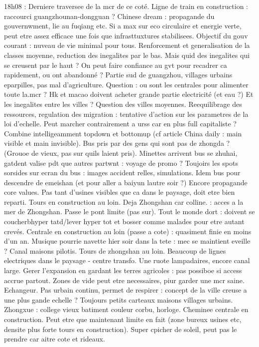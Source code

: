 18h08 :
Derniere traversee de la mcr de ce coté. Ligne de train en construction : raccourci guangzhounan-dongguan ?
Chinese dream : propagande du gouvernwment, lie au fuqiang etc. 
Si a max sur eco circulaire et energie verte, peut etre assez efficace une fois que infrasttuxtures stabilisees. Objectif du gouv courant : nuveau de vie minimal pour tous. Renforcement et generalisation de la classes moyenne, reduction des inegalites par le bas. Mais quid des inegalites qui se creusent par le haut ? On peut faire confiance au gvt pour recadrer ca rapidement, ou ont abandonné ?
Partie sud de guangzhou, villages urbains eparpilles, pas mal d'agriculture. Question : ou sont les centrales pour alimenter toute la.mcr ? Hk et macao doivent acheter grande partie electricité (et eau ?)
Et les inegalites entre les villes ? Question des villes moyennes. Reequilibrage des ressources, regulation des migration : tentative d'action sur les parametres de la loi d'echelle. Peut marcher contrairement a urss car en plus full capitaliste ? Combine intelligeamment topdown et bottomup (cf article China daily : main visible et main invisible).
Bus pris par des gens qui sont pas de zhongda ? (Grouoe de vieux, pas sur quils laient pris). Minettes arrivent bus se zhuhai, gatdent valise pdt que autres partwnt : voyage de promo ?
Toujoirs les spots sorsides sur ecran du bus : images accident relles, simulations. Idem bus pour descendre de emeishan (et pour aller a baiyun lautre soir ?)
Encore propagande core values. Pas tant d'usines visibles que ca dans le paysage, doit etre bien reparti. Tours en construction au loin. Deja Zhongshan car colline. : acces a la mer de Zhongshan. Passe le pont limite (pas sur).
Tout le monde dort : doivent se coucherbhyper tatd/lever hyper tot et bosser comme malades pour etre autant crevés. Centrale en construction au loin (passe a cote) : quasiment finie en moins d'un an.
Musique pourrie navette hier soir dans la tete : mec se maintient eveille ?
Canal maisons pilotis. Tours de zhongshan au loin. Beaucoup de lignes electriques dans le paysage - centre transfo.
Une ruote lampadaires, encore canal large.
Gerer l'expansion en gardant les terres agricoles : pas possiboe si access accrue partout. Zones de vide peut etre necessaires, piur garder une mcr saine.
Echangeur.
Pas urbain continu, permet de respirer : concept de la ville creuse a une plus gande echelle ?
Toujours petits carteaux maisons villages urbains.
Zhongxue : college vieux batiment couleur corbu, horloge. Cheminee centrale en construction.
Peut etre que maintenant limite en fait (zone bureux usines etc, densite plus forte tours en construction). Super cpicher de soleil, peut pas le prendre car aitre cote et rideaux.
